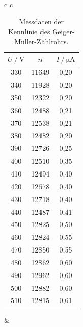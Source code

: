 \begin{table}[H]
    \centering
    \caption{Messdaten der Kennlinie des Geiger-Müller-Zählrohrs.}
    \label{tab:messdaten}

    \begin{tabular}{c c}   %
        \begin{tabular}{c c c} 
            \hline
            \toprule
            $U \mathbin{/} \mathrm{V}$ & $n$ &  $I \mathbin{/} \unit{\micro\ampere}$ \\
            \midrule
            330 & 11649 &      0,20 \\
            340 & 11928 &      0,20 \\
            350 & 12322 &      0,20 \\
            360 & 12488 &      0,21 \\
            370 & 12538 &      0,21 \\
            380 & 12482 &      0,20 \\
            390 & 12726 &      0,25 \\
            400 & 12510 &      0,35 \\
            410 & 12494 &      0,40 \\
            420 & 12678 &      0,40 \\
            430 & 12718 &      0,40 \\
            440 & 12487 &      0,41 \\
            450 & 12825 &      0,50 \\
            460 & 12824 &      0,55 \\
            470 & 12850 &      0,55 \\
            480 & 12862 &      0,60 \\
            490 & 12962 &      0,60 \\
            500 & 12882 &      0,60 \\
            510 & 12815 &      0,61 \\
            \bottomrule
            \hline
        \end{tabular} &  %


\end{tabular}
\end{table}
